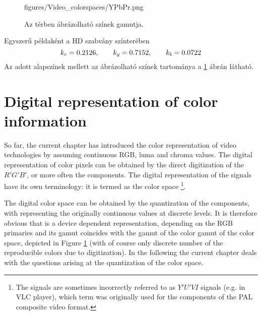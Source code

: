 \begin{figure}[]
	\centering
	\begin{minipage}[c]{0.6\textwidth}
	\begin{overpic}[width = 1\columnwidth ]{figures/Video_colorspaces/YPbPr.png}
	\end{overpic} \end{minipage}\hfill
	\begin{minipage}[c]{0.4\textwidth}
	\caption{Az \ypbpr térben ábrázolható színek gamutja.}
	\label{Fig:ypbpr_gamut}  \end{minipage}
\end{figure}
Egyszerű példaként a HD szabvány színterében 
\begin{equation}
k_r = 0.2126, \hspace{7mm}
k_g = 0.7152, \hspace{7mm}
k_b = 0.0722
\end{equation}
Az adott alapszínek mellett az ábrázolható színek tartománya a \ref{Fig:ypbpr_gamut} ábrán látható.

\section{Digital representation of color information}

So far, the current chapter has introduced the color representation of video technologies by assuming continuous RGB, luma and chroma values.
The digital representation of color pixels can be obtained by the direct digitization of the $R'G'B'$, or more often the \ypbpr components.
The digital representation of the \ypbpr signals have its own terminology: it is termed as the \ycbcr color space \footnote{
The \ycbcr signals are sometimes incorrectly referred to as $Y'U'VI$ signals (e.g. in VLC player), which term was originally used for the components of the PAL composite video format.}.

The \ycbcr digital color space can be obtained by the quantization of the \ypbpr components, with representing the originally continuous values at discrete levels.
It is therefore obvious that \ycbcr is a device dependent representation, depending on the RGB primaries and its gamut coincides with the gamut of the color gamut of the \ypbpr color space, depicted in Figure \ref{Fig:ypbpr_gamut} (with of course only discrete number of the reproducible colors due to digitization).
In the following the current chapter deals with the questions arising at the quantization of the \ypbpr color space.

